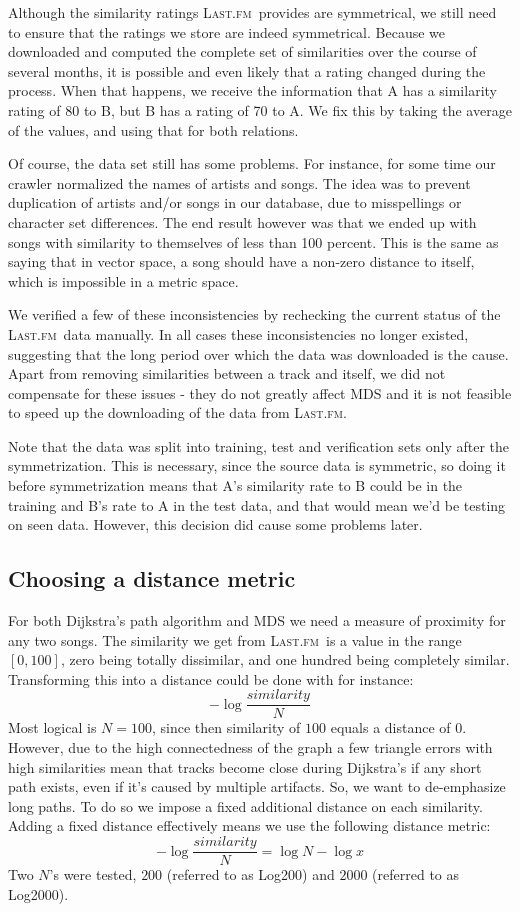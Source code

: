 \documentclass[10pt,fleqn,a4paper]{article}
\newcommand{\lastfm}{\textsc{Last.fm}}
\begin{document}
\begin{twocolumn}
Although the similarity ratings \lastfm~provides are symmetrical, we still need to ensure that the ratings we store are indeed symmetrical. Because we downloaded and computed the complete set of similarities over the course of several months, it is possible and even likely that a rating changed during the process. When that happens, we receive the information that A has a similarity rating of 80 to B, but B has a rating of 70 to A. We fix this by taking the average of the values, and using that for both relations.

Of course, the data set still has some problems. For instance, for some time our crawler normalized the names of artists and songs. The idea was to prevent duplication of artists and/or songs in our database, due to misspellings or character set differences. The end result however was that we ended up with songs with similarity to themselves of less than 100 percent. This is the same as saying that in vector space, a song should have a non-zero distance to itself, which is impossible in a metric space.

We verified a few of these inconsistencies by rechecking the current status of the \lastfm~data manually.  In all cases these inconsistencies no longer existed, suggesting that the long period over which the data was downloaded is the cause.  Apart from removing similarities between a track and itself, we did not compensate for these issues - they do not greatly affect MDS and it is not feasible to speed up the downloading of the data from \lastfm.

\label{symmetrization} Note that the data was split into training, test and verification sets only after the symmetrization.  This is necessary, since the source data is symmetric, so doing it before symmetrization means that A's similarity rate to B could be in the training and B's rate to A in the test data, and that would mean we'd be testing on seen data.  However, this decision did cause some problems later.

\subsection{Choosing a distance metric}

For both Dijkstra's path algorithm and MDS we need a measure of proximity for any two songs. The similarity we get from \lastfm~is a value in the range $[0, 100]$, zero being totally dissimilar, and one hundred being completely similar. Transforming this into a distance could be done with for instance:
%
\[-\log\frac{similarity}{N} \]
%
Most logical is $N = 100$, since then similarity of $100$ equals a distance of $0$. However, due to the high connectedness of the graph a few triangle errors with high similarities mean that tracks become close during Dijkstra's if any short path exists, even if it's caused by multiple artifacts. So, we want to de-emphasize long paths. To do so we impose a fixed additional distance on each similarity. Adding a fixed distance effectively means we use the following distance metric:
%
\[-\log\frac{similarity}{N}  =  \log N - \log x \]
%
Two $N$'s were tested, $200$ (referred to as Log200) and $2000$ (referred to as Log2000).


\end{twocolumn}
\end{document}
